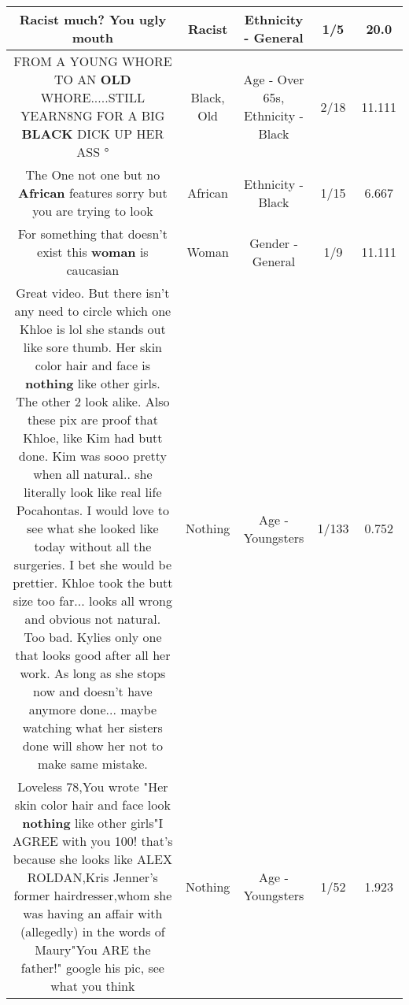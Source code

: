 \documentclass[11pt]{article}
\newlength\mylength
\begin{document}
\begin{center}
\begin{longtable}{|C{.65\mylength}|C{.30\mylength}|C{.12\mylength}|C{.12\mylength}|C{.12\mylength}|}
  \small Racist much? You ugly mouth\normalsize   & Racist & Ethnicity - General & 1/5 & 20.0 \\  \hline
  \small FROM A YOUNG WHORE TO AN \textbf{OLD} WHORE.....STILL YEARN8NG FOR A  BIG \textbf{BLACK} DICK UP HER ASS °\normalsize   & Black, Old & Age - Over 65s, Ethnicity - Black & 2/18 & 11.111 \\  \hline
  \small The One not one but no \textbf{African} features sorry  but you are trying to look\normalsize   & African & Ethnicity - Black & 1/15 & 6.667 \\  \hline
  \small For something that doesn't exist this \textbf{woman} is caucasian\normalsize   & Woman & Gender - General & 1/9 & 11.111 \\  \hline
  \small Great video. But there isn't any need to circle which one Khloe is lol she stands out like sore thumb. Her skin color hair and face is \textbf{nothing} like other girls. The other 2 look alike. Also these pix are proof that Khloe, like Kim had butt done. Kim was sooo pretty when all natural.. she literally look like real life Pocahontas. I would love to see what she looked like today without all the surgeries. I bet she would be prettier. Khloe took the butt size too far... looks all wrong and obvious not natural. Too bad. Kylies only one that looks good after all her work. As long as she stops now and doesn't have anymore done... maybe watching what her sisters done will show her not to make same mistake.\normalsize   & Nothing & Age - Youngsters & 1/133 & 0.752 \\  \hline
  \small Loveless 78,You wrote "Her skin color hair and face look \textbf{nothing} like other girls"I AGREE with you 100! that's because she looks like ALEX ROLDAN,Kris Jenner's former hairdresser,whom she was having an affair with (allegedly) in the words of Maury"You ARE the father!" google his pic, see what you think\normalsize   & Nothing & Age - Youngsters & 1/52 & 1.923 \\  \hline

\end{longtable}
\end{center}
\end{document}
